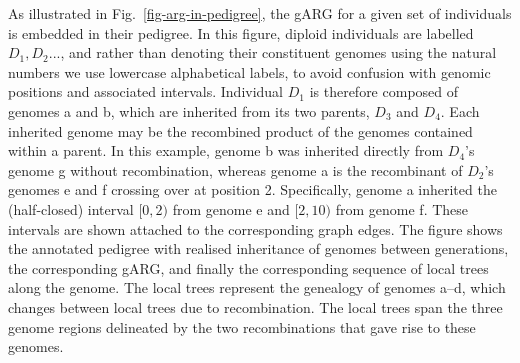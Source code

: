 \documentclass{article}
\newcommand{\noderef}[1]{\textsf{#1}}
\begin{document}
As illustrated in Fig.~\ref{fig-arg-in-pedigree},
the gARG for a given set of individuals is embedded in their pedigree.
In this figure, diploid individuals are labelled $D_1, D_2...$, and
rather than denoting their constituent genomes using the natural numbers
we use lowercase alphabetical labels, to avoid confusion with genomic
positions and associated intervals. Individual $D_1$ is therefore composed
of genomes \noderef{a} and \noderef{b}, which are inherited from its
two parents, $D_3$ and $D_4$. Each inherited genome may be the recombined product
of the genomes contained within a parent. In this example,
genome \noderef{b} was inherited directly from $D_4$'s genome \noderef{g} without
recombination, whereas
genome \noderef{a} is the recombinant of
$D_2$'s genomes \noderef{e} and \noderef{f} crossing over at position 2.
Specifically, genome \noderef{a} inherited the (half-closed)
interval $[0, 2)$ from genome \noderef{e} and $[2, 10)$ from genome \noderef{f}.
These intervals are shown attached to the corresponding graph edges.
The figure shows the annotated pedigree with realised inheritance of genomes
between generations, the corresponding gARG, and finally the corresponding
sequence of local trees along the genome.
The local trees represent the genealogy of genomes \noderef{a}--\noderef{d},
which changes between local trees due to recombination.
The local trees span the three genome regions delineated
by the two recombinations that gave rise to these genomes.
\end{document}
